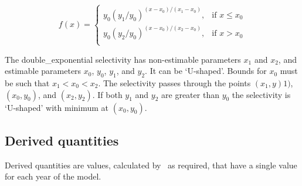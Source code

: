 \begin{equation} 
f(x)=\begin{cases}
	  y_0(y_1 / y_0)^{(x-x_0)/(x_1-x_0)}, & \text{if $x \le x_0$} \\
	  y_0(y_2 / y_0)^{(x-x_0)/(x_2-x_0)}, & \text{if $x > x_0$} \\
  \end{cases}
\end{equation}

The double\_exponential selectivity has non-estimable parameters $x_1$ and $x_2$, and estimable parameters $x_0$, $y_0$, $y_1$, and $y_2$. It can be `U-shaped'. Bounds for $x_0$ must be such that $x_1 < x_0 < x_2$. The selectivity passes through the points $(x_1, y)1)$, $(x_0, y_0)$, and $(x_2, y_2)$. If both $y_1$ and $y_2$ are greater than $y_0$ the selectivity is `U-shaped' with minimum at $(x_0, y_0)$.

\subsection{Derived quantities\label{sec:derived-quantities}}

Derived quantities are values, calculated by \SPM\ as required, that have a single value for each year of the model. 
